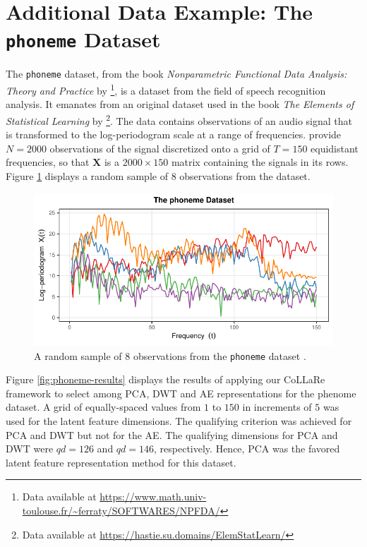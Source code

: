 \section{Additional Data Example: The \texttt{phoneme} Dataset}\label{sec:additional-data}

The \texttt{phoneme} dataset, from the book \emph{Nonparametric Functional Data Analysis: Theory and Practice} by \textcite{ferraty_nonparametric_2006}\footnote{Data available at \url{https://www.math.univ-toulouse.fr/~ferraty/SOFTWARES/NPFDA/}}, is a dataset from the field of speech recognition analysis.
It emanates from an original dataset used in the book \emph{The Elements of Statistical Learning} by \textcite{hastie_elements_2009}\footnote{Data available at \url{https://hastie.su.domains/ElemStatLearn/}}.
The data contains observations of an audio signal that is transformed to the log-periodogram scale at a range of frequencies.
\textcite{ferraty_nonparametric_2006} provide $N=2000$ observations of the signal discretized onto a grid of $T=150$ equidistant frequencies, so that $\mathbf{X}$ is a $2000\times 150$ matrix containing the signals in its rows.
Figure \ref{fig:phoneme} displays a random sample of $8$ observations from the dataset.

\begin{figure}[h]
    \centering
    \includegraphics[width=0.75\linewidth]{figures/phoneme.pdf}
    \caption{A random sample of $8$ observations from the \texttt{phoneme} dataset \parencite{hastie_elements_2009, ferraty_nonparametric_2006}.}
    \label{fig:phoneme}
\end{figure}

Figure \ref{fig:phoneme-results} displays the results of applying our CoLLaRe framework to select among PCA, DWT and AE representations for the phenome dataset. A grid of equally-spaced values from $1$ to $150$ in increments of $5$ was used for the latent feature dimensions.
The qualifying criterion was achieved for PCA and DWT but not for the AE. The qualifying dimensions for PCA and DWT were $qd=126$ and $qd = 146$, respectively. Hence, PCA was the favored latent feature representation method for this dataset.


